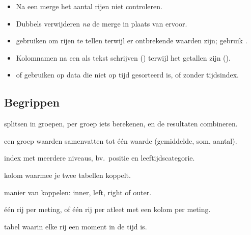 \documentclass[11pt,a4paper]{article}
\begin{document}
\begin{itemize}
  \item Na een merge het aantal rijen niet controleren.
  \item Dubbels verwijderen \emph{na} de merge in plaats van ervoor.
  \item {} gebruiken om rijen te tellen terwijl er
        ontbrekende waarden zijn; gebruik .
  \item Kolomnamen na een  als tekst schrijven
        () terwijl het getallen zijn ().
  \item {} of  gebruiken op data die niet op
        tijd gesorteerd is, of zonder tijdsindex.
\end{itemize}

\subsection*{Begrippen}

\begin{description}[leftmargin=3.2cm, labelwidth=3.0cm, font=\normalfont\bfseries]
  \item[groupby] splitsen in groepen, per groep iets berekenen, en de resultaten combineren.
  \item[aggregatie] een groep waarden samenvatten tot één waarde (gemiddelde, som, aantal).
  \item[MultiIndex] index met meerdere niveaus, bv.\ positie en leeftijdscategorie.
  \item[sleutel] kolom waarmee je twee tabellen koppelt.
  \item[join] manier van koppelen: inner, left, right of outer.
  \item[lang / breed] één rij per meting, of één rij per atleet met een kolom per meting.
  \item[tijdreeks] tabel waarin elke rij een moment in de tijd is.
\end{description}
\end{document}
